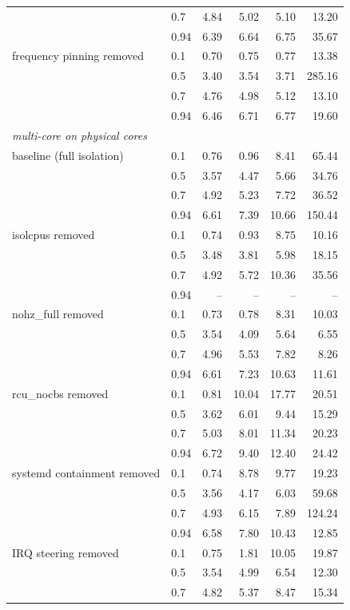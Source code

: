 \begin{tabular}{llrrrr}
 & 0.7 & 4.84 & 5.02 & 5.10 & 13.20 \\
 & 0.94 & 6.39 & 6.64 & 6.75 & 35.67 \\
\addlinespace
frequency pinning removed & 0.1 & 0.70 & 0.75 & 0.77 & 13.38 \\
 & 0.5 & 3.40 & 3.54 & 3.71 & 285.16 \\
 & 0.7 & 4.76 & 4.98 & 5.12 & 13.10 \\
 & 0.94 & 6.46 & 6.71 & 6.77 & 19.60 \\
\midrule
\multicolumn{6}{l}{\textit{multi-core on physical cores}} \\
baseline (full isolation) & 0.1 & 0.76 & 0.96 & 8.41 & 65.44 \\
 & 0.5 & 3.57 & 4.47 & 5.66 & 34.76 \\
 & 0.7 & 4.92 & 5.23 & 7.72 & 36.52 \\
 & 0.94 & 6.61 & 7.39 & 10.66 & 150.44 \\
\addlinespace
isolcpus removed & 0.1 & 0.74 & 0.93 & 8.75 & 10.16 \\
 & 0.5 & 3.48 & 3.81 & 5.98 & 18.15 \\
 & 0.7 & 4.92 & 5.72 & 10.36 & 35.56 \\
 & 0.94 & -- & -- & -- & -- \\
\addlinespace
nohz_full removed & 0.1 & 0.73 & 0.78 & 8.31 & 10.03 \\
 & 0.5 & 3.54 & 4.09 & 5.64 & 6.55 \\
 & 0.7 & 4.96 & 5.53 & 7.82 & 8.26 \\
 & 0.94 & 6.61 & 7.23 & 10.63 & 11.61 \\
\addlinespace
rcu_nocbs removed & 0.1 & 0.81 & 10.04 & 17.77 & 20.51 \\
 & 0.5 & 3.62 & 6.01 & 9.44 & 15.29 \\
 & 0.7 & 5.03 & 8.01 & 11.34 & 20.23 \\
 & 0.94 & 6.72 & 9.40 & 12.40 & 24.42 \\
\addlinespace
systemd containment removed & 0.1 & 0.74 & 8.78 & 9.77 & 19.23 \\
 & 0.5 & 3.56 & 4.17 & 6.03 & 59.68 \\
 & 0.7 & 4.93 & 6.15 & 7.89 & 124.24 \\
 & 0.94 & 6.58 & 7.80 & 10.43 & 12.85 \\
\addlinespace
IRQ steering removed & 0.1 & 0.75 & 1.81 & 10.05 & 19.87 \\
 & 0.5 & 3.54 & 4.99 & 6.54 & 12.30 \\
 & 0.7 & 4.82 & 5.37 & 8.47 & 15.34 \\

\end{tabular}
